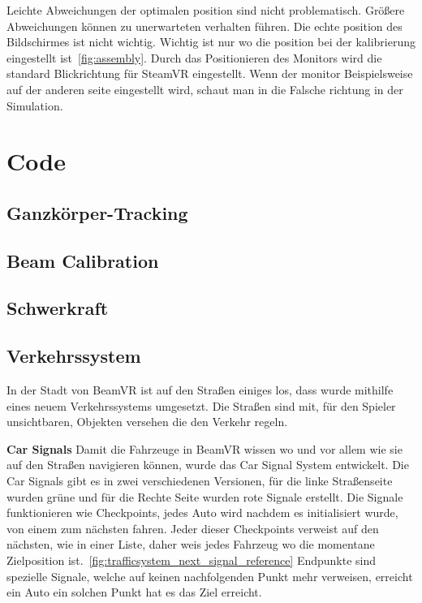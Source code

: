 Leichte Abweichungen der optimalen position sind nicht problematisch.
Größere Abweichungen können zu unerwarteten verhalten führen.
Die echte position des Bildschirmes ist nicht wichtig.
Wichtig ist nur wo die position bei der kalibrierung eingestellt ist~\ref{fig:assembly}.
Durch das Positionieren des Monitors wird die standard Blickrichtung für SteamVR eingestellt.
Wenn der monitor Beispielsweise auf der anderen seite eingestellt wird, schaut man in die Falsche richtung in der Simulation.

\section{Code}
\label{sec:code}

\subsection{Ganzkörper-Tracking}
\label{sec:full-body-tracking}

\subsection{Beam Calibration}
\label{subsec:beam-calibration}

\subsection{Schwerkraft}
\label{subsec:gravity}

\subsection{Verkehrssystem}
\label{subsec:traffic-system}
In der Stadt von BeamVR ist auf den Straßen einiges los, dass wurde mithilfe eines neuem Verkehrssystems umgesetzt.
Die Straßen sind mit, f\"ur den Spieler unsichtbaren, Objekten versehen die den Verkehr regeln.

\textbf{Car Signals}
Damit die Fahrzeuge in BeamVR wissen wo und vor allem wie sie auf den Straßen navigieren k\"onnen, wurde das Car Signal System entwickelt.
Die Car Signals gibt es in zwei verschiedenen Versionen, f\"ur die linke Straßenseite wurden gr\"une und f\"ur die Rechte Seite wurden rote Signale erstellt.
Die Signale funktionieren wie Checkpoints, jedes Auto wird nachdem es initialisiert wurde, von einem zum n\"achsten fahren.
Jeder dieser Checkpoints verweist auf den nächsten, wie in einer Liste, daher weis jedes Fahrzeug wo die momentane Zielposition ist.~\ref{fig:trafficsystem_next_signal_reference}
Endpunkte sind spezielle Signale, welche auf keinen nachfolgenden Punkt mehr verweisen, erreicht ein Auto ein solchen Punkt hat es das Ziel erreicht.

